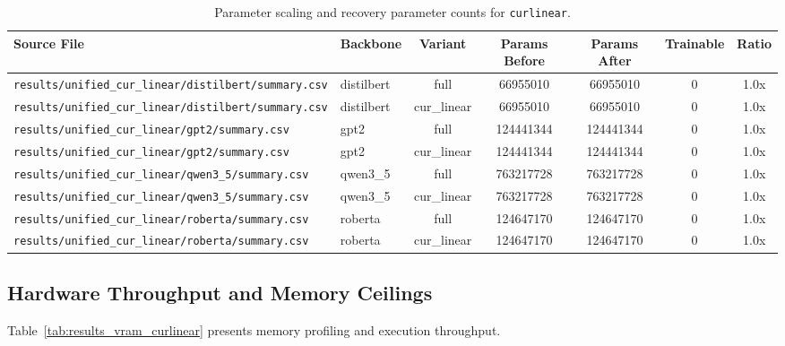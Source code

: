 \begin{table}[t]
\centering
\small
\begin{tabular}{llccccc}
\toprule
\textbf{Source File} & \textbf{Backbone} & \textbf{Variant} & \textbf{Params Before} & \textbf{Params After} & \textbf{Trainable} & \textbf{Ratio} \\
\midrule
\texttt{results/unified\_cur\_linear/distilbert/summary.csv} & distilbert & full & 66955010 & 66955010 & 0 & 1.0x \\
\texttt{results/unified\_cur\_linear/distilbert/summary.csv} & distilbert & cur\_linear & 66955010 & 66955010 & 0 & 1.0x \\
\texttt{results/unified\_cur\_linear/gpt2/summary.csv} & gpt2 & full & 124441344 & 124441344 & 0 & 1.0x \\
\texttt{results/unified\_cur\_linear/gpt2/summary.csv} & gpt2 & cur\_linear & 124441344 & 124441344 & 0 & 1.0x \\
\texttt{results/unified\_cur\_linear/qwen3\_5/summary.csv} & qwen3\_5 & full & 763217728 & 763217728 & 0 & 1.0x \\
\texttt{results/unified\_cur\_linear/qwen3\_5/summary.csv} & qwen3\_5 & cur\_linear & 763217728 & 763217728 & 0 & 1.0x \\
\texttt{results/unified\_cur\_linear/roberta/summary.csv} & roberta & full & 124647170 & 124647170 & 0 & 1.0x \\
\texttt{results/unified\_cur\_linear/roberta/summary.csv} & roberta & cur\_linear & 124647170 & 124647170 & 0 & 1.0x \\
\bottomrule
\end{tabular}
\caption{Parameter scaling and recovery parameter counts for \texttt{curlinear}.}
\label{tab:results_params_curlinear}
\end{table}

\subsection{Hardware Throughput and Memory Ceilings}
Table~\ref{tab:results_vram_curlinear} presents memory profiling and execution throughput.

